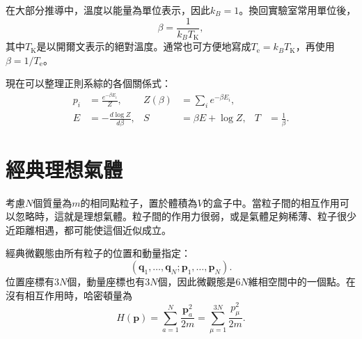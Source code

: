 在大部分推導中，溫度以能量為單位表示，因此\(k_B=1\)。換回實驗室常用單位後，
\begin{equation}
 \beta=\frac{1}{k_B T_{\mathrm K}},
 \label{eq:sm4-beta-laboratory}
\end{equation}
其中\(T_{\mathrm K}\)是以開爾文表示的絕對溫度。通常也可方便地寫成\(T_{\mathrm e}=k_BT_{\mathrm K}\)，再使用\(\beta=1/T_{\mathrm e}\)。

\begin{classroomqa}
\end{classroomqa}

現在可以整理正則系綜的各個關係式：
\begin{align}
 p_i&=\frac{e^{-\beta E_i}}{Z},&
 Z(\beta)&=\sum_i e^{-\beta E_i},\label{eq:sm4-canonical-pair}\\
 E&=-\frac{d\log Z}{d\beta},&
 S&=\beta E+\log Z,&
 T&=\frac{1}{\beta}.
 \label{eq:sm4-canonical-identities}
\end{align}

\section{經典理想氣體}

考慮\(N\)個質量為\(m\)的相同點粒子，置於體積為\(V\)的盒子中。當粒子間的相互作用可以忽略時，這就是理想氣體。粒子間的作用力很弱，或是氣體足夠稀薄、粒子很少近距離相遇，都可能使這個近似成立。

經典微觀態由所有粒子的位置和動量指定：
\begin{equation}
 (\bm q_1,\ldots,\bm q_N;\bm p_1,\ldots,\bm p_N).
\end{equation}
位置座標有\(3N\)個，動量座標也有\(3N\)個，因此微觀態是\(6N\)維相空間中的一個點。在沒有相互作用時，哈密頓量為
\begin{equation}
 H(\bm p)=\sum_{a=1}^{N}\frac{\bm p_a^2}{2m}
 =\sum_{\mu=1}^{3N}\frac{p_\mu^2}{2m}.
 \label{eq:sm4-ideal-hamiltonian}
\end{equation}

\begin{classroomqa}
\end{classroomqa}


